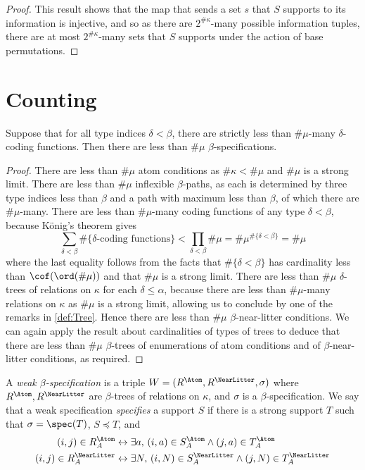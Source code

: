 \begin{proof}
  This result shows that the map that sends a set \( s \) that \( S \) supports to its information is injective, and so as there are \( 2^{\#\kappa} \)-many possible information tuples, there are at most \( 2^{\#\kappa} \)-many sets that \( S \) supports under the action of base permutations.
\end{proof}

\section{Counting}
\begin{proposition}
  \label{prop:card_spec}
  Suppose that for all type indices \( \delta < \beta \), there are strictly less than \( \#\mu \)-many \( \delta \)-coding functions.
  Then there are less than \( \#\mu \) \( \beta \)-specifications.
\end{proposition}
\begin{proof}
  There are less than \( \#\mu \) atom conditions as \( \#\kappa < \#\mu \) and \( \#\mu \) is a strong limit.
  There are less than \( \#\mu \) inflexible \( \beta \)-paths, as each is determined by three type indices less than \( \beta \) and a path with maximum less than \( \beta \), of which there are \( \#\mu \)-many.
  There are less than \( \#\mu \)-many coding functions of any type \( \delta < \beta \), because K\"onig's theorem gives
  \[ \sum_{\delta < \beta} \#\{\delta\text{-coding functions}\} < \prod_{\delta < \beta} \#\mu = \#\mu^{\#\{\delta < \beta\}} = \#\mu \]
  where the last equality follows from the facts that \( \#\{\delta < \beta\} \) has cardinality less than \( \cof(\ord(\#\mu)) \) and that \( \#\mu \) is a strong limit.
  There are less than \( \#\mu \) \( \delta \)-trees of relations on \( \kappa \) for each \( \delta \leq \alpha \), because there are less than \( \#\mu \)-many relations on \( \kappa \) as \( \#\mu \) is a strong limit, allowing us to conclude by one of the remarks in \cref{def:Tree}.
  Hence there are less than \( \#\mu \) \( \beta \)-near-litter conditions.
  We can again apply the result about cardinalities of types of trees to deduce that there are less than \( \#\mu \) \( \beta \)-trees of enumerations of atom conditions and of \( \beta \)-near-litter conditions, as required.
\end{proof}
\begin{definition}
  \label{def:WeakSpec}
  A \emph{weak \( \beta \)-specification} is a triple \( W = (R^\Atom, R^\NearLitter, \sigma) \) where \( R^\Atom, R^\NearLitter \) are \( \beta \)-trees of relations on \( \kappa \), and \( \sigma \) is a \( \beta \)-specification.
  We say that a weak specification \emph{specifies} a support \( S \) if there is a strong support \( T \) such that \( \sigma = \spec(T) \), \( S \preceq T \), and
  \begin{align*}
    (i, j) \in R_A^\Atom &\leftrightarrow \exists a,\, (i, a) \in S_A^\Atom \wedge (j, a) \in T_A^\Atom \\
    (i, j) \in R_A^\NearLitter &\leftrightarrow \exists N,\, (i, N) \in S_A^\NearLitter \wedge (j, N) \in T_A^\NearLitter
  \end{align*}
\end{definition}
